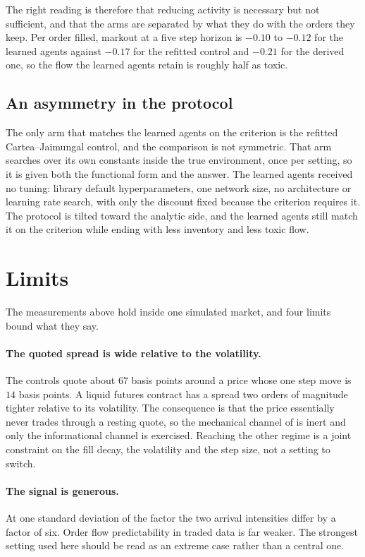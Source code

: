 \documentclass[10pt,twocolumn]{article}
\begin{document}
The right reading is therefore that reducing activity is necessary but not sufficient, and that the arms are
separated by what they do with the orders they keep. Per order filled, markout at a five step horizon is $-0.10$
to $-0.12$ for the learned agents against $-0.17$ for the refitted control and $-0.21$ for the derived one, so the
flow the learned agents retain is roughly half as toxic.

\subsection{An asymmetry in the protocol}

The only arm that matches the learned agents on the criterion is the refitted Cartea--Jaimungal control, and the
comparison is not symmetric. That arm searches over its own constants inside the true environment, once per
setting, so it is given both the functional form and the answer. The learned agents received no tuning: library
default hyperparameters, one network size, no architecture or learning rate search, with only the discount fixed
because the criterion requires it. The protocol is tilted toward the analytic side, and the learned agents still
match it on the criterion while ending with less inventory and less toxic flow.

\section{Limits}

The measurements above hold inside one simulated market, and four limits bound what they say.

\paragraph{The quoted spread is wide relative to the volatility.}
The controls quote about $67$ basis points around a price whose one step move is $14$ basis points. A liquid
futures contract has a spread two orders of magnitude tighter relative to its volatility. The consequence is that
the price essentially never trades through a resting quote, so the mechanical channel of
\citet{lalor2024adverse} is inert and only the informational channel is exercised. Reaching the other regime is a
joint constraint on the fill decay, the volatility and the step size, not a setting to switch.

\paragraph{The signal is generous.}
At one standard deviation of the factor the two arrival intensities differ by a factor of six. Order flow
predictability in traded data is far weaker. The strongest setting used here should be read as an extreme case
rather than a central one.
\end{document}
